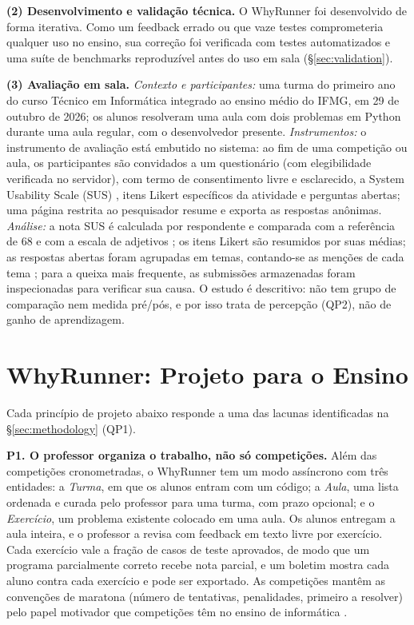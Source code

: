\documentclass[12pt]{article}
\begin{document}
\textbf{(2) Desenvolvimento e validação técnica.} O WhyRunner foi desenvolvido de forma iterativa. Como um feedback errado ou que vaze testes comprometeria qualquer uso no ensino, sua correção foi verificada com testes automatizados e uma suíte de benchmarks reproduzível antes do uso em sala (\S\ref{sec:validation}).

\textbf{(3) Avaliação em sala.} \emph{Contexto e participantes:} uma turma do primeiro ano do curso Técnico em Informática integrado ao ensino médio do IFMG, em 29 de outubro de 2026; os alunos resolveram uma aula com dois problemas em Python durante uma aula regular, com o desenvolvedor presente. \emph{Instrumentos:} o instrumento de avaliação está embutido no sistema: ao fim de uma competição ou aula, os participantes são convidados a um questionário (com elegibilidade verificada no servidor), com termo de consentimento livre e esclarecido, a System Usability Scale (SUS) \cite{brooke1996sus}, itens Likert específicos da atividade e perguntas abertas; uma página restrita ao pesquisador resume e exporta as respostas anônimas. \emph{Análise:} a nota SUS é calculada por respondente e comparada com a referência de 68 \cite{sauro2011sus} e com a escala de adjetivos \cite{bangor2009sus}; os itens Likert são resumidos por suas médias; as respostas abertas foram agrupadas em temas, contando-se as menções de cada tema \cite{braun2006thematic}; para a queixa mais frequente, as submissões armazenadas foram inspecionadas para verificar sua causa. O estudo é descritivo: não tem grupo de comparação nem medida pré/pós, e por isso trata de percepção (QP2), não de ganho de aprendizagem.

\section{WhyRunner: Projeto para o Ensino}\label{sec:design}

Cada princípio de projeto abaixo responde a uma das lacunas identificadas na \S\ref{sec:methodology} (QP1).

\textbf{P1. O professor organiza o trabalho, não só competições.}\label{sec:class-lesson-model} Além das competições cronometradas, o WhyRunner tem um modo assíncrono com três entidades: a \emph{Turma}, em que os alunos entram com um código; a \emph{Aula}, uma lista ordenada e curada pelo professor para uma turma, com prazo opcional; e o \emph{Exercício}, um problema existente colocado em uma aula. Os alunos entregam a aula inteira, e o professor a revisa com feedback em texto livre por exercício. Cada exercício vale a fração de casos de teste aprovados, de modo que um programa parcialmente correto recebe nota parcial, e um boletim mostra cada aluno contra cada exercício e pode ser exportado. As competições mantêm as convenções de maratona (número de tentativas, penalidades, primeiro a resolver) pelo papel motivador que competições têm no ensino de informática \cite{audrito2012contests}.
\end{document}
